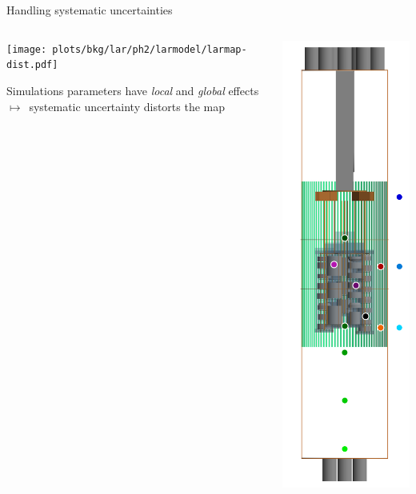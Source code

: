 \documentclass[10pt,aspectratio=169]{beamer}
\newcommand{\arrow}{$\longmapsto$}
\begin{document}
\begin{frame}{Handling systematic uncertainties}
  \begin{columns}
    \begin{column}{0.85\textwidth}
      \begin{center}
        \texttt{[image: plots/bkg/lar/ph2/larmodel/larmap-dist.pdf]}
      \end{center}
      Simulations parameters have \emph{local} and \emph{global} effects
      \arrow\ systematic uncertainty \alert{distorts} the map
    \end{column}
    \begin{column}{0.15\textwidth}
      \begin{center}
        \includegraphics[height=0.9\textheight]{plots/bkg/lar/ph2/larmodel/lar-points-position.pdf}

\end{center}
\end{column}
\end{columns}
\end{frame}
\end{document}

